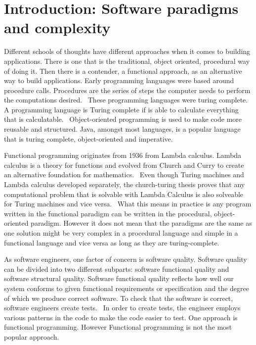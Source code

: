 \chapter{Introduction: Software paradigms and complexity}\label{introduction}

Different schools of thoughts have different approaches when it comes to
building applications. There is one that is the traditional, object oriented,
procedural way of doing it. Then there is a contender, a functional approach, as
an alternative way to build applications.  Early programming languages were
based around procedure calls. Procedures are the series of steps the computer
needs to perform the computations desired.~\cite{proceduralprogramming} These
programming languages were turing complete. A programming language is Turing
complete if is able to calculate everything that is
calculatable.~\cite{turingmachine} Object-oriented programming is used to make
code more reusable and structured. Java, amongst most languages, is a popular
language that is turing complete, object-oriented and imperative.~\cite{java} 

Functional programming originates from 1936 from Lambda calculus. Lambda
calculus is a theory for functions and evolved from Church and Curry to create
an alternative foundation for mathematics.~\cite{Turner} Even though Turing
machines and Lambda calculus developed separately, the church-turing thesis
proves that any computational problem that is solvable with Lambda Calculus is
also solveable for Turing machines and vice versa.~\cite{sep-church-turing} What
this means in practice is any program written in the functional paradigm can be
written in the procedural, object-oriented paradigm. However it does not mean
that the paradigms are the same as one solution might be very complex in a
procedural language and simple in a functional language and vice versa as long
as they are turing-complete.

As software engineers, one factor of concern is software quality. Software
quality can be divided into two different subparts: software functional quality
and software structural quality. Software functional quality reflects how well
our system conforms to given functional requirements or specification and the
degree of which we produce correct software.  To check that the software is
correct, software engineers create tests.~\cite{Pressman:2004:SEP:994110} In
order to create tests, the engineer employs various patterns in the code to make
the code easier to test. One approach is functional programming. However
Functional programming is not the most popular approach.

